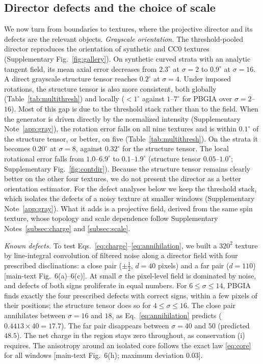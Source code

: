 \documentclass[11pt,a4paper]{article}
\begin{document}
\subsection{Director defects and the choice of scale}\label{subsec:res:defects}
We now turn from boundaries to textures, where the projective director and its defects are the relevant objects. \emph{Grayscale orientation.} The threshold-pooled director reproduces the orientation of synthetic and CC0 textures (Supplementary Fig.~\ref{fig:gallery}). On synthetic curved strata with an analytic tangent field, its mean axial error decreases from $2.3^\circ$ at $\sigma=2$ to $0.9^\circ$ at $\sigma=16$. A direct grayscale structure tensor reaches $0.2^\circ$ at $\sigma=4$. Under imposed rotations, the structure tensor is also more consistent, both globally (Table~\ref{tab:multithresh}) and locally ($<1^\circ$ against $1$--$7^\circ$ for PBGIA over $\sigma=2$--$16$). Most of this gap is due to the threshold stack rather than to the field. When the generator is driven directly by the normalized intensity (Supplementary Note~\ref{app:gray}), the rotation error falls on all nine textures and is within $0.1^\circ$ of the structure tensor, or better, on five (Table~\ref{tab:multithresh}). On the strata it becomes $0.20^\circ$ at $\sigma=8$, against $0.32^\circ$ for the structure tensor. The local rotational error falls from $1.0$--$6.9^\circ$ to $0.1$--$1.9^\circ$ (structure tensor $0.05$--$1.0^\circ$; Supplementary Fig.~\ref{fig:contdir}). Because the structure tensor remains clearly better on the other four textures, we do not present the director as a better orientation estimator. For the defect analyses below we keep the threshold stack, which isolates the defects of a noisy texture at smaller windows (Supplementary Note~\ref{app:gray}). What it adds is a projective field, derived from the same spin texture, whose topology and scale dependence follow Supplementary Notes~\ref{subsec:charge} and \ref{subsec:scale}.

\emph{Known defects.} To test Eqs.~\eqref{eq:charge}--\eqref{eq:annihilation}, we built a $320^2$ texture by line-integral convolution of filtered noise along a director field with four prescribed disclinations: a close pair ($\pm\tfrac12$, $d=40$ pixels) and a far pair ($d=110$) [main-text Fig.~6(a)--6(c)]. At small $\sigma$ the pixel-level field is dominated by noise, and defects of both signs proliferate in equal numbers. For $6\le\sigma\le14$, PBGIA finds exactly the four prescribed defects with correct signs, within a few pixels of their positions; the structure tensor does so for $4\le\sigma\le16$. The close pair annihilates between $\sigma=16$ and $18$, as Eq.~\eqref{eq:annihilation} predicts ($0.4413\times40=17.7$). The far pair disappears between $\sigma=40$ and $50$ (predicted $48.5$). The net charge in the region stays zero throughout, as conservation (i) requires. The anisotropy around an isolated core follows the exact law \eqref{eq:core} for all windows [main-text Fig.~6(h); maximum deviation $0.03$].
\end{document}
